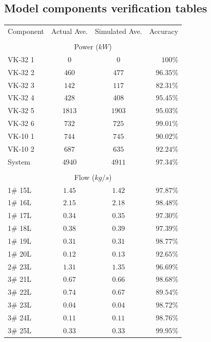 \begin{appendices}
\chapter{\hspace{0.3cm}Model components verification tables}\label{Verification}
\newpage
\begin{table}[h!]
	\centering
	\begin{tabular}{lccr}
		\hline 
		Component & Actual Ave. & Simulated  Ave. & Accuracy \\ \hhline{====} 
		\\
		\multicolumn{4}{c}{Power ($ kW $)}
		\\
		VK-32 1 & $  0  $ & $  0  $ & $ 100   $\% \\
		VK-32 2 & $ 460 $ & $ 477 $ & $ 96.35 $\% \\
		VK-32 3 & $ 142 $ & $ 117 $ & $ 82.31 $\% \\
		VK-32 4 & $ 428 $ & $ 408 $ & $ 95.45 $\% \\
		VK-32 5 & $ 1813$ & $ 1903$ & $ 95.03 $\% \\
		VK-32 6 & $ 732 $ & $ 725 $ & $ 99.01 $\% \\
		VK-10 1 & $ 744 $ & $ 745 $ & $ 90.02 $\% \\
		VK-10 2 & $ 687 $ & $ 635 $ & $ 92.24 $\% \\
		System  & $ 4940$ & $4911 $ & $ 97.34 $\% \\
		\\
		\multicolumn{4}{c}{Flow ($ kg/s $)}
		\\
		1\# 15L  & $ 1.45 $ & $ 1.42 $ & $ 97.87 $\% \\
		1\# 16L  & $ 2.15 $ & $ 2.18 $ & $ 98.48 $\% \\
		1\# 17L  & $ 0.34 $ & $ 0.35 $ & $ 97.30 $\% \\
		1\# 18L  & $ 0.38 $ & $ 0.39 $ & $ 97.39 $\% \\
		1\# 19L  & $ 0.31 $ & $ 0.31 $ & $ 98.77 $\% \\
		1\# 20L  & $ 0.12 $ & $ 0.13 $ & $ 92.65 $\% \\
		2\# 23L  & $ 1.31 $ & $ 1.35 $ & $ 96.69 $\% \\
		3\# 21L  & $ 0.67 $ & $ 0.66 $ & $ 98.68 $\% \\
		3\# 22L  & $ 0.74 $ & $ 0.67 $ & $ 89.54 $\% \\
		3\# 23L  & $ 0.04 $ & $ 0.04 $ & $ 98.72 $\% \\
		3\# 24L  & $ 0.11 $ & $ 0.11 $ & $ 98.76 $\% \\
		3\# 25L  & $ 0.33 $ & $ 0.33 $ & $ 99.95 $\% \\

\end{tabular}
\end{table}
\end{appendices}

